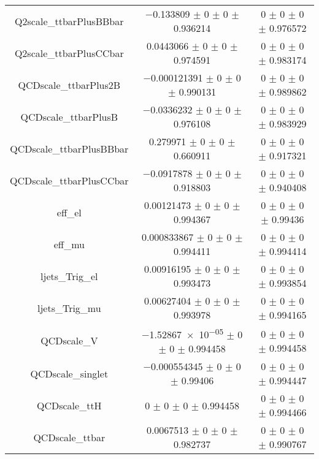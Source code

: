 \begin{table}
\begin{tabular}{ccc}
Q2scale\_ttbarPlusBBbar & \num{-0.133809} $\pm$ \num{0} $\pm$ \num{0} $\pm$ \num{0.936214} & \num{0} $\pm$ \num{0} $\pm$ \num{0} $\pm$ \num{0.976572}\\
Q2scale\_ttbarPlusCCbar & \num{0.0443066} $\pm$ \num{0} $\pm$ \num{0} $\pm$ \num{0.974591} & \num{0} $\pm$ \num{0} $\pm$ \num{0} $\pm$ \num{0.983174}\\
QCDscale\_ttbarPlus2B & \num{-0.000121391} $\pm$ \num{0} $\pm$ \num{0} $\pm$ \num{0.990131} & \num{0} $\pm$ \num{0} $\pm$ \num{0} $\pm$ \num{0.989862}\\
QCDscale\_ttbarPlusB & \num{-0.0336232} $\pm$ \num{0} $\pm$ \num{0} $\pm$ \num{0.976108} & \num{0} $\pm$ \num{0} $\pm$ \num{0} $\pm$ \num{0.983929}\\
QCDscale\_ttbarPlusBBbar & \num{0.279971} $\pm$ \num{0} $\pm$ \num{0} $\pm$ \num{0.660911} & \num{0} $\pm$ \num{0} $\pm$ \num{0} $\pm$ \num{0.917321}\\
QCDscale\_ttbarPlusCCbar & \num{-0.0917878} $\pm$ \num{0} $\pm$ \num{0} $\pm$ \num{0.918803} & \num{0} $\pm$ \num{0} $\pm$ \num{0} $\pm$ \num{0.940408}\\
eff\_el & \num{0.00121473} $\pm$ \num{0} $\pm$ \num{0} $\pm$ \num{0.994367} & \num{0} $\pm$ \num{0} $\pm$ \num{0} $\pm$ \num{0.99436}\\
eff\_mu & \num{0.000833867} $\pm$ \num{0} $\pm$ \num{0} $\pm$ \num{0.994411} & \num{0} $\pm$ \num{0} $\pm$ \num{0} $\pm$ \num{0.994414}\\
ljets\_Trig\_el & \num{0.00916195} $\pm$ \num{0} $\pm$ \num{0} $\pm$ \num{0.993473} & \num{0} $\pm$ \num{0} $\pm$ \num{0} $\pm$ \num{0.993854}\\
ljets\_Trig\_mu & \num{0.00627404} $\pm$ \num{0} $\pm$ \num{0} $\pm$ \num{0.993978} & \num{0} $\pm$ \num{0} $\pm$ \num{0} $\pm$ \num{0.994165}\\
QCDscale\_V & \num{-1.52867e-05} $\pm$ \num{0} $\pm$ \num{0} $\pm$ \num{0.994458} & \num{0} $\pm$ \num{0} $\pm$ \num{0} $\pm$ \num{0.994458}\\
QCDscale\_singlet & \num{-0.000554345} $\pm$ \num{0} $\pm$ \num{0} $\pm$ \num{0.99406} & \num{0} $\pm$ \num{0} $\pm$ \num{0} $\pm$ \num{0.994447}\\
QCDscale\_ttH & \num{0} $\pm$ \num{0} $\pm$ \num{0} $\pm$ \num{0.994458} & \num{0} $\pm$ \num{0} $\pm$ \num{0} $\pm$ \num{0.994466}\\
QCDscale\_ttbar & \num{0.0067513} $\pm$ \num{0} $\pm$ \num{0} $\pm$ \num{0.982737} & \num{0} $\pm$ \num{0} $\pm$ \num{0} $\pm$ \num{0.990767}\\

\end{tabular}
\end{table}
